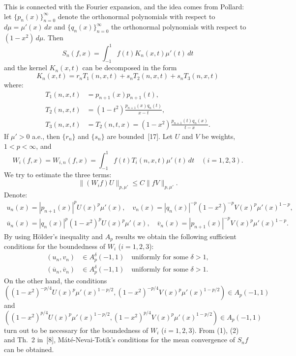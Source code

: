 \documentclass[11pt,a4paper]{article}
\theoremstyle{plain}
\theoremstyle{definition}
\theoremstyle{remark}
\begin{document}
This is connected with the Fourier expansion, and the idea comes 
from Pollard: let $\{p_{n}(x)\}_{n=0}^{\infty}$ denote 
the orthonormal polynomials with respect to $d\mu = \mu'(x)\,dx$ 
and $\{q_{n}(x)\}_{n=0}^{\infty}$ the orthonormal 
polynomials with respect to $(1-x^{2})\,d\mu$. Then
$$
S_{n}(f,x) = \int_{-1}^{1} f(t)K_{n}(x,t)\mu'(t)\,dt
$$
and the kernel $K_{n}(x,t)$ can be decomposed in the form
$$
K_{n}(x,t) = r_{n}T_{1}(n,x,t) + s_{n}T_{2}(n,x,t) + 
s_{n}T_{3}(n,x,t)
$$
where:
\begin{align*}
T_{1}(n,x,t) &= p_{n+1}(x)p_{n+1}(t),\\
T_{2}(n,x,t) &= (1-t^{2}) \frac{p_{n+1}(x) q_{n}(t)}{x-t},\\
T_{3}(n,x,t) &= T_{2}(n,t,x) = (1-x^{2}) \frac{p_{n+1}(t) q_{n}(x)}{t-x}.
\end{align*}
If $\mu' > 0$ a.e., then $\{r_{n}\}$ and $\{s_{n}\}$ are bounded~[17].
Let $U$ and $V$ be weights, $1 < p < \infty$, and
$$
W_{i}(f,x) = W_{i,n}(f,x) = \int_{-1}^{1} f(t)T_{i}(n,x,t)\mu'(t)\,dt
\quad (i = 1,2,3).
$$
We try to estimate the three terms:
$$
\|(W_{i}f)U\|_{p,\mu'} \leq C\|fV\|_{p,\mu'}.
$$
Denote:
\begin{gather*}
u_{n}(x) = |p_{n+1}(x)|^{p}U(x)^{p}\mu'(x), \quad
v_{n}(x) = |q_{n}(x)|^{-p}(1-x^{2})^{-p}V(x)^{p}\mu'(x)^{1-p},\\
\overline{u}_{n}(x) = |q_{n}(x)|^{p}(1-x^{2})^{p}U(x)^{p}\mu'(x), \quad
\overline{v}_{n}(x) = |p_{n+1}(x)|^{-p}V(x)^{p}\mu'(x)^{1-p}.
\end{gather*}
By using H\"{o}lder's inequality and $A_{p}$ results we obtain the 
following sufficient conditions for the boundedness of $W_{i}$ ($i = 1,2,3$):
\begin{align*}
(u_{n},v_{n}) &\in A_{p}^{\delta}(-1,1) \quad\text{uniformly for 
some } \delta > 1,\\
(\overline{u}_{n},\overline{v}_{n}) &\in A_{p}^{\delta}(-1,1) 
\quad\text{uniformly for some } \delta > 1.
\end{align*}
On the other hand, the conditions
\begin{equation}
((1-x^{2})^{-p/4}U(x)^{p}\mu'(x)^{1-p/2},
(1-x^{2})^{-p/4}V(x)^{p}\mu'(x)^{1-p/2}) \in A_{p}(-1,1)
\tag{1}
\end{equation}
and
\begin{equation}
((1-x^{2})^{p/4}U(x)^{p}\mu'(x)^{1-p/2},
(1-x^{2})^{p/4}V(x)^{p}\mu'(x)^{1-p/2}) 
\in A_{p}(-1,1)
\tag{2}
\end{equation}
turn out to be necessary for the boundedness of $W_{i}$ ($i = 1,2,3$). 
From (1), (2) and Th.~2 in~[8], M\'at\'e-Nevai-Totik's conditions 
for the mean convergence of $S_{n}f$ can be obtained.
\end{document}
